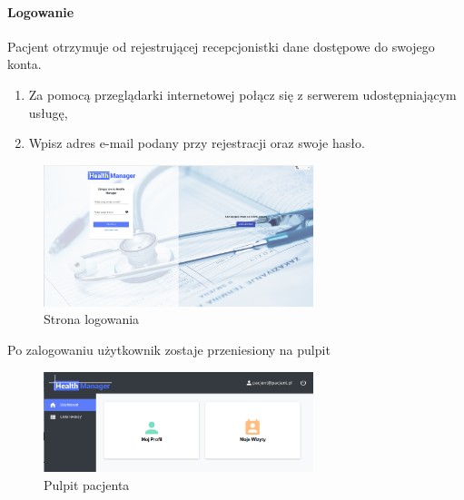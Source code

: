 \documentclass[polish,12pt]{aghthesis}
\begin{document}
    \paragraph{Logowanie}{
    Pacjent otrzymuje od rejestrującej recepcjonistki dane dostępowe do swojego konta. \\
    \begin{enumerate}
        \item Za pomocą przeglądarki internetowej połącz się z serwerem udostępniającym usługę,
        \item Wpisz adres e-mail podany przy rejestracji oraz swoje hasło.
    \end{enumerate}
    \begin{figure}[H]
        \includegraphics[width=0.7\textwidth]{gui-loginpage}
        \caption{Strona logowania}
    \end{figure}
    Po zalogowaniu użytkownik zostaje przeniesiony na pulpit
    \begin{figure}[H]
        \includegraphics[width=0.7\textwidth]{gui-patient-dashboard}
        \caption{Pulpit pacjenta}
    \end{figure}
        
    }
\end{document}
